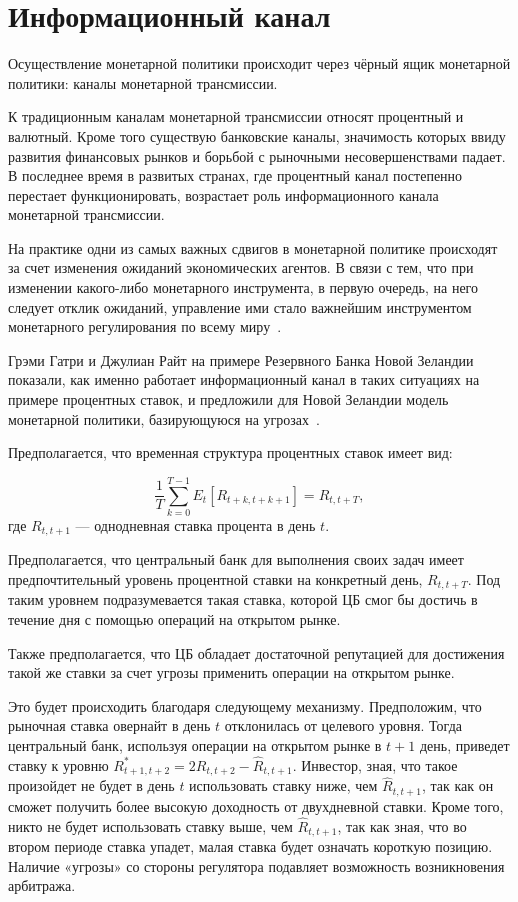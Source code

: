 \documentclass[14pt,a4paper, oneside]{extreport}
\theoremstyle{plain}              %
\theoremstyle{definition}         %
\begin{document}
\section{Информационный канал}

Осуществление монетарной политики происходит через чёрный ящик монетарной политики: каналы монетарной трансмиссии.

К традиционным каналам монетарной трансмиссии относят процентный и валютный. Кроме того существую банковские каналы, значимость которых ввиду развития финансовых рынков и борьбой с рыночными несовершенствами падает. В последнее время в развитых странах, где процентный канал постепенно перестает функционировать, возрастает роль информационного канала монетарной трансмиссии.

На практике одни из самых важных сдвигов в монетарной политике происходят за счет изменения ожиданий экономических агентов. В связи с тем, что при изменении какого-либо монетарного инструмента, в первую очередь, на него следует отклик ожиданий, управление ими стало важнейшим инструментом монетарного регулирования по всему миру~\cite{boivin2010has}.

Грэми Гатри и Джулиан Райт на примере Резервного Банка Новой Зеландии показали, как именно работает информационный канал в таких ситуациях на примере процентных ставок, и предложили для Новой Зеландии модель монетарной политики, базирующуюся на угрозах~\cite{guthrie2000open}.

Предполагается, что временная структура процентных ставок имеет вид:

\begin{equation}
\frac{1}{T} \sum_{k=0}^{T-1} E_t[R_{t+k,t+k+1}] =  R_{t,t+T},
\end{equation} где $R_{t,t+1}$ --- однодневная ставка процента в день $t$.

Предполагается, что центральный банк для выполнения своих задач имеет предпочтительный уровень процентной ставки на конкретный день, $R_{t,t+T}$. Под таким уровнем подразумевается такая ставка, которой ЦБ смог бы достичь в течение дня с помощью операций на открытом рынке. 

Также предполагается, что ЦБ обладает достаточной репутацией для достижения такой же ставки за счет угрозы применить операции на открытом рынке. 

Это будет происходить благодаря следующему механизму. Предположим, что рыночная ставка овернайт в день $t$ отклонилась от целевого уровня. Тогда центральный банк, используя операции на открытом рынке в $t+1$ день, 
приведет ставку к уровню $R^*_{t+1,t+2} = 2R_{t,t+2} - \hat R_{t,t+1}$. Инвестор, зная, что такое произойдет не будет в день $t$ использовать ставку ниже, чем $\hat R_{t,t+1}$, так как он сможет получить более высокую доходность от двухдневной ставки. Кроме того, никто не будет использовать ставку выше, чем $\hat R_{t,t+1}$, так как зная, что во втором периоде ставка упадет, малая ставка будет означать короткую позицию. Наличие «угрозы» со стороны регулятора подавляет возможность возникновения арбитража.  
\end{document}
